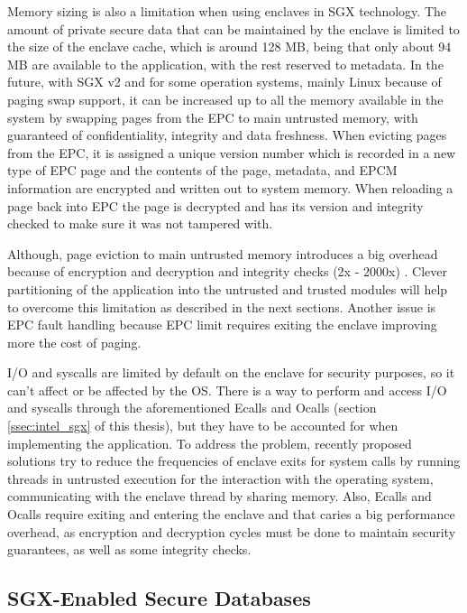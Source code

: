 Memory sizing is also a limitation when using enclaves in \gls{SGX} technology. The amount of private secure data that can be maintained by the enclave is limited to the size of the enclave cache, which is around 128 \gls{MB}, being that only about 94 \gls{MB} are available to the application, with the rest reserved to metadata. In the future, with \gls{SGX} v2 and for some operation systems, mainly Linux because of paging swap support, it can be increased up to all the memory available in the system \cite{sgx:1} by swapping pages from the \gls{EPC} to main untrusted memory, with guaranteed of confidentiality, integrity and data freshness. When evicting pages from the \gls{EPC}, it is assigned a unique version number which is recorded in a new type of \gls{EPC} page and the contents of the page, metadata, and \gls{EPCM} information are encrypted and written out to system memory. When reloading a page back into \gls{EPC} the page is decrypted and has its version and integrity checked to make sure it was not tampered with.

Although, page eviction to main untrusted memory introduces a big overhead because of encryption and decryption and integrity checks (2x - 2000x) \cite{scone:1}. Clever partitioning of the application into the untrusted and trusted modules will help to overcome this limitation as described in the next sections. Another issue is \gls{EPC} fault handling because \gls{EPC} limit requires exiting the enclave improving more the cost of paging.

\gls{I/O} and \glspl{syscall} are limited by default on the enclave for security purposes, so it can't affect or be affected by the \gls{OS}. There is a way to perform and access \gls{I/O} and \glspl{syscall} through the aforementioned \glspl{Ecall} and \glspl{Ocall} (section \ref{ssec:intel_sgx} of this thesis), but they have to be accounted for when implementing the application. To address the problem, recently proposed solutions try to reduce the frequencies of enclave exits for system calls by running threads in untrusted execution for the interaction with the operating system, communicating with the enclave thread by sharing memory. Also, \glspl{Ecall} and \glspl{Ocall} require exiting and entering the enclave and that caries a big performance overhead, as encryption and decryption cycles must be done to maintain security guarantees, as well as some integrity checks.

\subsection{SGX-Enabled Secure Databases}
\label{ssec:sgx_enabled_secure_databases}

